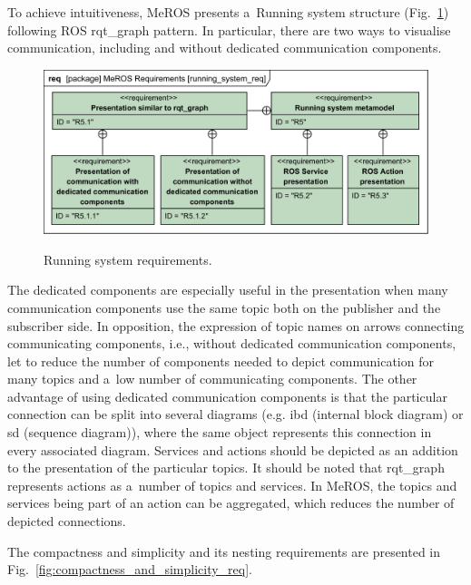 \documentclass[11pt,oneside,a4paper]{report}
\begin{document}
	To achieve intuitiveness, MeROS presents a~Running system structure (Fig.~\ref{fig:running_system_req}) following ROS rqt\_graph pattern. In particular, there are two ways to visualise communication, including and without	dedicated communication components.
	\begin{figure}[H]
		\centering
		\begin{center}
			{\includegraphics[scale=1.0]{diagrams/running_system_req.png}}
		\end{center}
		\caption{Running system requirements. } 
		\label{fig:running_system_req}
	\end{figure}
	 The dedicated components are especially useful in the presentation when many communication components use the same topic both on the publisher and the subscriber side. In opposition, the expression of topic names on arrows connecting communicating components, i.e., without dedicated communication components, let to reduce the number of components needed to depict communication for many topics and a~low number of communicating components. The other advantage of using dedicated communication components is that the particular connection can be split into several diagrams (e.g. ibd (internal block diagram) or sd (sequence diagram)), where the same object represents this connection in every associated diagram. Services and actions should be depicted as an addition to the presentation of the particular topics. It should be noted that rqt\_graph represents actions as a~number of topics and services. In MeROS, the topics and services being part of an action can be aggregated, which reduces the number of depicted connections.
		
	The compactness and simplicity and its nesting requirements are presented in Fig.~\ref{fig:compactness_and_simplicity_req}. 
	
\end{document}
